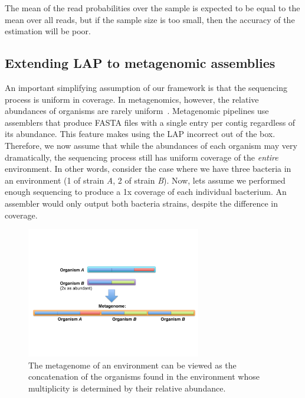 \documentclass[conference]{IEEEtran}
\begin{document}
The mean of the read probabilities over the sample is expected to be equal to the mean over all reads, but if the sample size is too small, then the accuracy of the estimation will be poor.

\subsection{Extending LAP to metagenomic assemblies}
An important simplifying assumption of our framework is that the sequencing process is uniform in coverage.
In metagenomics, however, the relative abundances of organisms are rarely uniform~\cite{carrigg2007dna,krsek1999comparison,morgan2010metagenomic,temperton2009bias,darling2004mauve}.
Metagenomic pipelines use assemblers that produce FASTA files with a single entry per contig regardless of its abundance.
This feature makes using the LAP incorrect out of the box.
Therefore, we now assume that while the abundances of each organism may very dramatically, the sequencing process still has uniform coverage of the \emph{entire} environment.
In other words, consider the case where we have three bacteria in an environment (1 of strain \emph{A}, 2 of strain \emph{B}).
Now, lets assume we performed enough sequencing to produce a 1x coverage of each individual bacterium.
An assembler would only output both bacteria strains, despite the difference in coverage.


\begin{figure}[!t]
\centering
\includegraphics[width=3in]{metagenome}
\caption{The metagenome of an environment can be viewed as the concatenation of the organisms found in the environment whose multiplicity is determined by their relative abundance.}
\label{fig:metagenome}
\end{figure}
\end{document}
